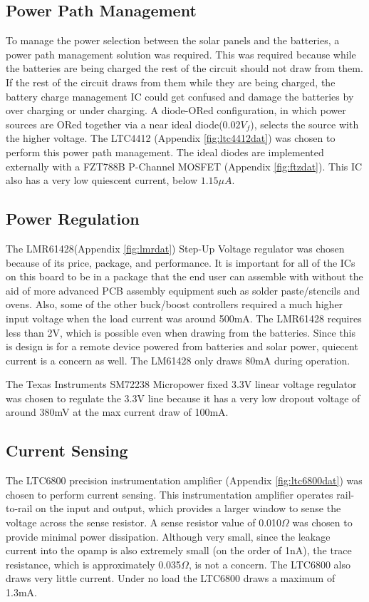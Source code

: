 \documentclass{article}
\numberwithin{figure}{section}
\numberwithin{equation}{section}
\begin{document}
{\subsection{Power Path Management} \label{sect_pow_just}
To manage the power selection between the solar panels and the batteries, a power path management solution was required. This was required because while the batteries are being charged the rest of the circuit should not draw from them. If the rest of the circuit draws from them while they are being charged, the battery charge management IC could get confused and damage the batteries by over charging or under charging. A diode-ORed configuration, in which power sources are ORed together via a near ideal diode($0.02V_f$), selects the source with the higher voltage. The LTC4412 (Appendix \ref{fig:ltc4412dat}) was chosen to perform this power path management. The ideal diodes are implemented externally with a FZT788B P-Channel MOSFET (Appendix \ref{fig:ftzdat}). This IC also has a very low quiescent current, below $1.15\mu A$.

\subsection{Power Regulation} \label{sect:reg_just}
The LMR61428(Appendix \ref{fig:lmrdat}) Step-Up Voltage regulator was chosen because of its price, package, and performance. It is important for all of the ICs on this board to be in a package that the end user can assemble with without the aid of more advanced PCB assembly equipment such as solder paste/stencils and ovens. Also, some of the other buck/boost controllers required a much higher input voltage when the load current was around 500mA. The LMR61428 requires less than 2V, which is possible even when drawing from the batteries. Since this is design is for a remote device powered from batteries and solar power, quiecent current is a concern as well. The LM61428 only draws 80mA during operation.

\bigskip
The Texas Instruments SM72238 Micropower fixed 3.3V linear voltage regulator was chosen to regulate the 3.3V line because it has a very low dropout voltage of around 380mV at the max current draw of 100mA.

\subsection{Current Sensing} \label{sect:cur_just}
The LTC6800 precision instrumentation amplifier (Appendix \ref{fig:ltc6800dat}) was chosen to perform current sensing. This instrumentation amplifier operates rail-to-rail on the input and output, which provides a larger window to sense the voltage across the sense resistor. A sense resistor value of 0.010$\Omega$ was chosen to provide minimal power dissipation. Although very small, since the leakage current into the opamp is also extremely small (on the order of 1nA), the trace resistance, which is approximately 0.035$\Omega$, is not a concern. The LTC6800 also draws very little current. Under no load the LTC6800 draws a maximum of 1.3mA.

}
\end{document}
